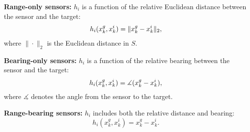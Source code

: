 	\textbf{Range-only sensors:} 
	$h_i$ is a function of the relative Euclidean distance between the sensor and the target:
	\small\begin{equation*}%
		h_i(\xg_k,x^i_k)=\|\xg_k-x^i_k\|_2,
	\end{equation*}	\normalsize
	where $\|\cdot\|_2$ is the Euclidean distance in $S$.
	
	\textbf{Bearing-only sensors:} 
	$h_i$ is a function of the relative bearing between the sensor and the target:
	\small\begin{equation*}
		h_i(x^g_k,x^i_k)=\measuredangle (x^g_k-x^i_k),
	\end{equation*}\normalsize
	where $\measuredangle$ denotes the angle from the sensor to the target.
	
	\textbf{Range-bearing sensors:} $h_i$ includes both the relative distance and bearing: %
	\small\begin{equation*}
		h_i(x^g_k,x^i_k)=x^g_k-x^i_k.
	\end{equation*}\normalsize
	
